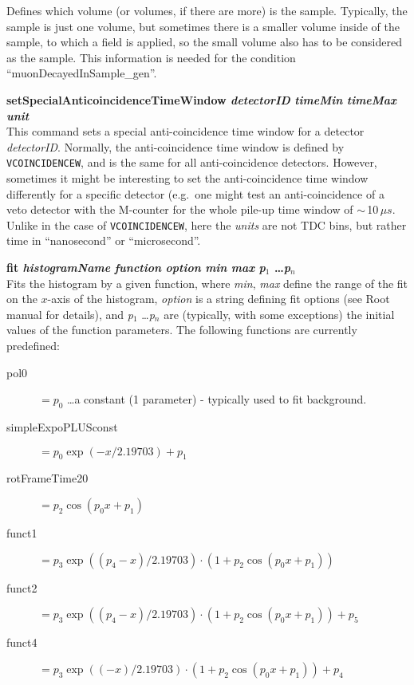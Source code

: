 \documentclass[twoside]{dis04}
\begin{document}
\begin{description}
     Defines which volume (or volumes, if there are more) is the sample.  Typically, the
     sample is just one volume, but sometimes there is a smaller volume inside of the sample,
     to which a field is applied, so the small volume also has to be considered as the sample.
     This information is needed for the condition ``muonDecayedInSample\_gen''.
   \item{\bf  setSpecialAnticoincidenceTimeWindow  \emph{detectorID}  \emph{timeMin}  \emph{timeMax} \emph{unit}} \\
     This command sets a special anti-coincidence time window for a detector \emph{detectorID}.
     Normally, the anti-coincidence time window is defined by {\tt VCOINCIDENCEW}, and is the same for all anti-coincidence
     detectors.  However, sometimes it might be interesting to set the anti-coincidence time window
     differently for a specific detector (e.g.\ one might test an anti-coincidence of a veto detector with 
     the M-counter for the whole pile-up time window of $\sim$\,10\,$\mu s$. 
     Unlike in the case of {\tt VCOINCIDENCEW}, here the \emph{units} are not TDC bins, but
     rather time in ``nanosecond'' or ``microsecond''.
   \item{\bf  fit  \emph{histogramName}  \emph{function} \emph{option} \emph{min}  \emph{max} \emph{p$_1$} \ldots \emph{p$_n$}}  \\
     Fits the histogram by a given function, where \emph{min}, \emph{max} define the range of the fit
     on the $x$-axis of the histogram, \emph{option} is a string defining fit options (see Root manual for details), 
     and \emph{p$_1$} \ldots \emph{p$_n$} are (typically, with some exceptions) 
     the initial values of the function parameters.  The following functions are currently predefined:
     \begin{description}
       \item[pol0]    $=p_0$ \ldots  a constant (1 parameter) - typically used to fit background.
       \item[simpleExpoPLUSconst] $=p_0 \exp(-x/2.19703)+p_1$
       \item[rotFrameTime20] $= p_2 \cos(p_0 x+p_1)$
       \item[funct1]  $=p_3 \exp((p_4 - x)/2.19703) \cdot (1+p_2 \cos(p_0 x+p_1))$
       \item[funct2]  $=p_3 \exp((p_4 - x)/2.19703) \cdot (1+p_2 \cos(p_0 x+p_1)) + p_5$
       \item[funct4]  $=p_3 \exp((- x)/2.19703) \cdot (1+p_2 \cos(p_0 x+p_1)) + p_4$

\end{description}
\end{description}
\end{document}
